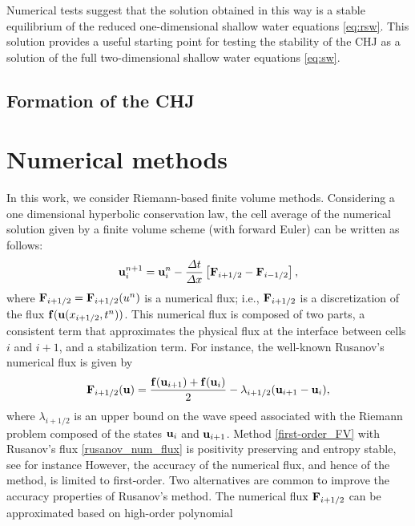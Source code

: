 \documentclass[preprint, 11pt]{article}
\newcommand{\bff}{{\bf f}}
\newcommand{\bfF}{{\bf F}}
\newcommand{\bfu}{{\bf u}}
\begin{document}
Numerical tests suggest that the solution obtained in this way is a stable equilibrium
of the reduced one-dimensional shallow water equations \eqref{eq:rsw}.  This
solution provides a useful starting point for testing the stability of the CHJ
as a solution of the full two-dimensional shallow water equations \eqref{eq:sw}.

\subsection{Formation of the CHJ}

\clearpage
\section{Numerical methods}
In this work, we consider Riemann-based finite volume methods.
Considering a one dimensional hyperbolic conservation law,
the cell average of the numerical solution given by a 
finite volume scheme (with forward Euler) can be written as follows:
\begin{align}\label{first-order_FV}
  \bfu_i^{n+1}=\bfu_i^n-\frac{\Delta t}{\Delta x}\left[\bfF_{i+1/2}-\bfF_{i-1/2}\right],
\end{align}
where $\bfF_{i+1/2}=\bfF_{i+1/2}(u^n)$ is a numerical flux; i.e., $\bfF_{i+1/2}$ is 
a discretization of the flux $\bff(\bfu(x_{i+1/2},t^n))$. 
This numerical flux is composed of two parts, a consistent term that approximates 
the physical flux at the interface between cells $i$ and $i+1$, and a stabilization term. 
For instance, the well-known Rusanov's numerical flux is given by 
\begin{align}\label{rusanov_num_flux}
  \bfF_{i+1/2}(\bfu)=\frac{\bff(\bfu_{i+1})+\bff(\bfu_i)}{2} - \lambda_{i+1/2}(\bfu_{i+1}-\bfu_i),
\end{align}
where $\lambda_{i+1/2}$ is an upper bound on the wave speed associated with the Riemann problem 
composed of the states $\bfu_i$ and $\bfu_{i+1}$. 
Method \eqref{first-order_FV} with Rusanov's flux \eqref{rusanov_num_flux}
is positivity preserving and entropy stable, see for instance 
\cite{perthame1996positivity,tadmor2003entropy,guermond2016invariant}
However, the accuracy of the numerical flux, and hence of the method, is 
limited to first-order. 
Two alternatives are common to improve the accuracy properties of Rusanov's method.
The numerical flux $\bfF_{i+1/2}$ can be approximated based on high-order polynomial 
\end{document}
